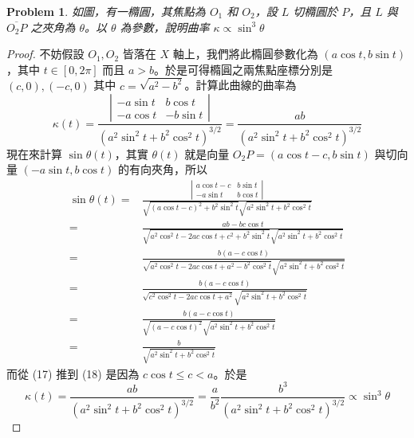 \documentclass[10pt,a4paper]{article}
\newcounter{theProblemCounter}
\newtheorem{problem}[theProblemCounter]{Problem}
\begin{document}
\setcounter{theProblemCounter}{6}
\begin{problem}
如圖，有一橢圓，其焦點為 $O_1$ 和 $O_2$，設 $L$ 切橢圓於 $P$，且 $L$ 與 $\overline{O_2P}$ 之夾角為 $\theta$。以 $\theta$ 為參數，說明曲率 $\kappa\propto\sin^3\theta$
\end{problem}
\begin{proof}
不妨假設 $O_1, O_2$ 皆落在 $X$ 軸上，我們將此橢圓參數化為 $(a\cos t, b\sin t)$，其中 $t\in [0, 2\pi]$ 而且 $a>b$。於是可得橢圓之兩焦點座標分別是 $(c, 0), (-c, 0)$ 其中 $c=\sqrt{a^2-b^2}$。計算此曲線的曲率為
\begin{equation}
\kappa(t) = \frac{\left|
\begin{array}{cc}
-a\sin t & b\cos t\\
-a\cos t & -b\sin t\end{array}
\right|}{(a^2 \sin^2 t + b^2 \cos^2 t)^{3/2}}
=\frac{ab}{(a^2 \sin^2 t + b^2 \cos^2 t)^{3/2}}
\end{equation}
現在來計算 $\sin\theta(t)$，其實 $\theta(t)$ 就是向量 $O_2P = (a\cos t-c, b\sin t)$ 與切向量 $(-a\sin t, b\cos t)$ 的有向夾角，所以
\begin{align}
\sin\theta(t) =& \frac{\left|
\begin{array}{cc}  a\cos t-c& b\sin t\\
-a\sin t & b\cos t\end{array}
\right|
}{\sqrt{(a\cos t-c)^2 + b^2\sin^2t} \sqrt{a^2\sin^2t+b^2\cos^2t}}\\
=& \frac{ab-bc\cos t}
{\sqrt{a^2\cos^2t-2ac\cos t+c^2 + b^2\sin^2t}\sqrt{a^2\sin^2t+b^2\cos^2t}}\\
=& \frac{b(a-c\cos t)}
{\sqrt{a^2\cos^2t-2ac\cos t+a^2-b^2\cos^2t}\sqrt{a^2\sin^2t+b^2\cos^2t}}\\
=&\frac{b(a-c\cos t)}
{\sqrt{c^2\cos^2t-2ac\cos t+a^2}\sqrt{a^2\sin^2t+b^2\cos^2t}}\\
=&\frac{b(a-c\cos t)}
{\sqrt{(a-c\cos t)^2}\sqrt{a^2\sin^2t+b^2\cos^2t}}\\
=&\frac{b}{\sqrt{a^2\sin^2t+b^2\cos^2t}}
\end{align}
而從 (17) 推到 (18) 是因為 $c\cos t \le c < a$。於是
\begin{equation}
\kappa(t) = \frac{ab}{(a^2\sin^2t+b^2\cos^2t)^{3/2}}
= \frac{a}{b^2} \frac{b^3}{(a^2\sin^2t+b^2\cos^2t)^{3/2}} \propto \sin^3\theta
\end{equation}
\end{proof}
\end{document}
